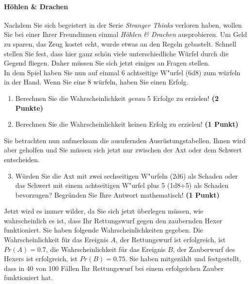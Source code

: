 \documentclass[a4paper, 9pt]{scrartcl}\usepackage[]{graphicx}\usepackage[]{xcolor}
\begin{document}
\paragraph{H{\"o}hlen \& Drachen}



Nachdem Sie sich begeistert in der Serie \textit{Stranger Thinks} verloren
haben, wollen Sie bei einer Ihrer Freundinnen einmal \textit{H{\"o}hlen \& Drachen}
ausprobieren. Um Geld zu sparen, das Zeug kostet echt, wurde etwas an den
Regeln gebastelt. Schnell stellen Sie fest, dass hier ganz sch{\"o}n viele
unterschiedliche W{\"u}rfel durch die Gegend fliegen. Daher m{\"u}ssen Sie sich
jetzt einiges an Fragen stellen. \\%

In dem Spiel haben Sie nun auf einmal 6 achtseitige W{"u}rfel (6d8) zum w{\"u}rfeln in der Hand. Wenn Sie eine 8 w{\"u}rfeln,
haben Sie einen Erfolg.

\begin{enumerate}
\item Berechnen Sie die Wahrscheinlichkeit \textit{genau}
  5 Erfolge zu erzielen!  \textbf{(2 Punkte)}
\item Berechnen Sie die Wahrscheinlichkeit keinen Erfolg zu erzielen!
  \textbf{(1 Punkt)}
\end{enumerate}

Sie betrachten nun aufmerksam die ausufernden Ausr{\"u}stungstabellen. Ihnen
wird aber geholfen und Sie m{\"u}ssen sich jetzt nur zwischen der Axt oder dem
Schwert entscheiden.

\begin{enumerate}
  \setcounter{enumi}{2}
\item W{\"u}rden Sie die Axt mit zwei sechseitigen W{"u}rfeln (2d6) als Schaden oder
  das Schwert mit einem achtseitigen W{"u}rfel plus 5 (1d8+5) als Schaden bevorzugen?
  Begr{\"u}nden Sie Ihre Antwort mathematisch! \textbf{(1 Punkt)}
\end{enumerate}

Jetzt wird es immer wilder, da Sie sich jetzt {\"u}berlegen m{\"u}ssen, wie
wahrscheinlich es ist, dass Ihr Rettungswurf gegen den zaubernden Hexer
funktioniert. Sie haben folgende Wahrscheinlichkeiten gegeben. Die
Wahrscheinlichkeit f{\"u}r das Ereignis $A$, der Rettungswurf ist erfolgreich,
ist $Pr(A) = 0.7$, die Wahrscheinlichkeit f{\"u}r das Ereignis $B$,
der Zauberwurf des Hexers ist erfolgreich, ist $Pr(B) = 0.75$. Sie
haben mitgez{\"a}hlt und festgestellt, dass in $40$ von 100 F{\"a}llen
Ihr Rettungswurf bei einem erfolgeichen Zauber funktioniert hat.  
\end{document}
